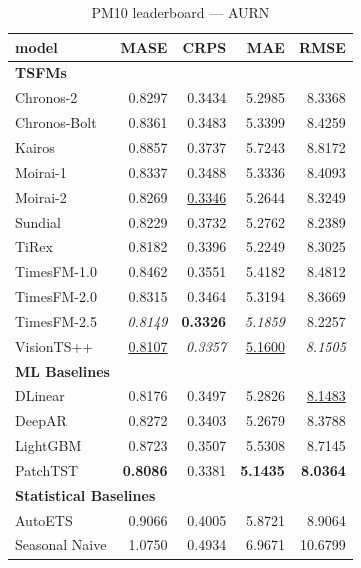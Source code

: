 \begin{table}[H]
\caption{PM10 leaderboard --- AURN}
\centering
\begin{small}
\begin{tabular}{lrrrr}
\toprule
model & MASE & CRPS & MAE & RMSE \\
\midrule
\multicolumn{5}{l}{\textbf{TSFMs}} \\
Chronos-2 & 0.8297 & 0.3434 & 5.2985 & 8.3368 \\
Chronos-Bolt & 0.8361 & 0.3483 & 5.3399 & 8.4259 \\
Kairos & 0.8857 & 0.3737 & 5.7243 & 8.8172 \\
Moirai-1 & 0.8337 & 0.3488 & 5.3336 & 8.4093 \\
Moirai-2 & 0.8269 & \underline{0.3346} & 5.2644 & 8.3249 \\
Sundial & 0.8229 & 0.3732 & 5.2762 & 8.2389 \\
TiRex & 0.8182 & 0.3396 & 5.2249 & 8.3025 \\
TimesFM-1.0 & 0.8462 & 0.3551 & 5.4182 & 8.4812 \\
TimesFM-2.0 & 0.8315 & 0.3464 & 5.3194 & 8.3669 \\
TimesFM-2.5 & \textit{0.8149} & \textbf{0.3326} & \textit{5.1859} & 8.2257 \\
VisionTS++ & \underline{0.8107} & \textit{0.3357} & \underline{5.1600} & \textit{8.1505} \\
\midrule
\multicolumn{5}{l}{\textbf{ML Baselines}} \\
DLinear & 0.8176 & 0.3497 & 5.2826 & \underline{8.1483} \\
DeepAR & 0.8272 & 0.3403 & 5.2679 & 8.3788 \\
LightGBM & 0.8723 & 0.3507 & 5.5308 & 8.7145 \\
PatchTST & \textbf{0.8086} & 0.3381 & \textbf{5.1435} & \textbf{8.0364} \\
\midrule
\multicolumn{5}{l}{\textbf{Statistical Baselines}} \\
AutoETS & 0.9066 & 0.4005 & 5.8721 & 8.9064 \\
Seasonal Naive & 1.0750 & 0.4934 & 6.9671 & 10.6799 \\
\bottomrule
\end{tabular}
\end{small}
\end{table}